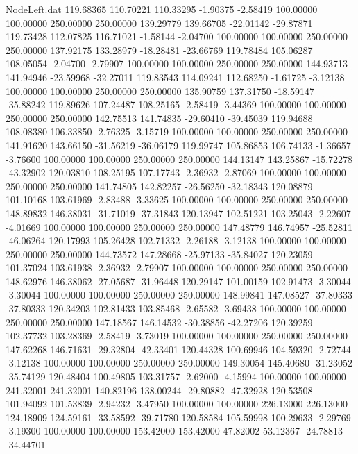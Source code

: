\begin{filecontents}{NodeLeft.dat}
 119.68365  110.70221  110.33295    -1.90375   -2.58419  100.00000  100.00000  250.00000  250.00000  139.29779  139.66705  -22.01142  -29.87871
 119.73428  112.07825  116.71021    -1.58144   -2.04700  100.00000  100.00000  250.00000  250.00000  137.92175  133.28979  -18.28481  -23.66769
 119.78484  105.06287  108.05054    -2.04700   -2.79907  100.00000  100.00000  250.00000  250.00000  144.93713  141.94946  -23.59968  -32.27011
 119.83543  114.09241  112.68250    -1.61725   -3.12138  100.00000  100.00000  250.00000  250.00000  135.90759  137.31750  -18.59147  -35.88242
 119.89626  107.24487  108.25165    -2.58419   -3.44369  100.00000  100.00000  250.00000  250.00000  142.75513  141.74835  -29.60410  -39.45039
 119.94688  108.08380  106.33850    -2.76325   -3.15719  100.00000  100.00000  250.00000  250.00000  141.91620  143.66150  -31.56219  -36.06179
 119.99747  105.86853  106.74133    -1.36657   -3.76600  100.00000  100.00000  250.00000  250.00000  144.13147  143.25867  -15.72278  -43.32902
 120.03810  108.25195  107.17743    -2.36932   -2.87069  100.00000  100.00000  250.00000  250.00000  141.74805  142.82257  -26.56250  -32.18343
 120.08879  101.10168  103.61969    -2.83488   -3.33625  100.00000  100.00000  250.00000  250.00000  148.89832  146.38031  -31.71019  -37.31843
 120.13947  102.51221  103.25043    -2.22607   -4.01669  100.00000  100.00000  250.00000  250.00000  147.48779  146.74957  -25.52811  -46.06264
 120.17993  105.26428  102.71332    -2.26188   -3.12138  100.00000  100.00000  250.00000  250.00000  144.73572  147.28668  -25.97133  -35.84027
 120.23059  101.37024  103.61938    -2.36932   -2.79907  100.00000  100.00000  250.00000  250.00000  148.62976  146.38062  -27.05687  -31.96448
 120.29147  101.00159  102.91473    -3.30044   -3.30044  100.00000  100.00000  250.00000  250.00000  148.99841  147.08527  -37.80333  -37.80333
 120.34203  102.81433  103.85468    -2.65582   -3.69438  100.00000  100.00000  250.00000  250.00000  147.18567  146.14532  -30.38856  -42.27206
 120.39259  102.37732  103.28369    -2.58419   -3.73019  100.00000  100.00000  250.00000  250.00000  147.62268  146.71631  -29.32804  -42.33401
 120.44328  100.69946  104.59320    -2.72744   -3.12138  100.00000  100.00000  250.00000  250.00000  149.30054  145.40680  -31.23052  -35.74129
 120.48404  100.49805  103.31757    -2.62000   -4.15994  100.00000  100.00000  241.32001  241.32001  140.82196  138.00244  -29.80882  -47.32928
 120.53508  101.94092  101.53839    -2.94232   -3.47950  100.00000  100.00000  226.13000  226.13000  124.18909  124.59161  -33.58592  -39.71780
 120.58584  105.59998  100.29633    -2.29769   -3.19300  100.00000  100.00000  153.42000  153.42000   47.82002   53.12367  -24.78813  -34.44701

\end{filecontents}
